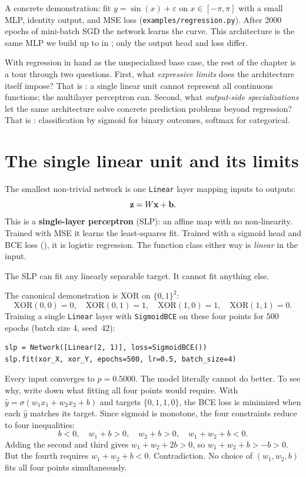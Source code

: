 A concrete demonstration: fit $y = \sin(x) + \varepsilon$ on
$x \in [-\pi, \pi]$ with a small MLP, identity output, and MSE loss
(\texttt{examples/regression.py}). After 2000 epochs of mini-batch SGD
the network learns the curve. This architecture is the same MLP we build
up to in ; only the output head and loss differ.

With regression in hand as the unspecialized base case, the rest of the
chapter is a tour through two questions. First, what
\emph{expressive limits} does the architecture itself impose? That is
: a single linear unit cannot
represent all continuous functions; the multilayer perceptron can.
Second, what \emph{output-side specializations} let the same
architecture solve concrete prediction problems beyond regression? That
is : classification by sigmoid for
binary outcomes, softmax for categorical.

\section{The single linear unit and its limits}\label{sec:linear-limits}

The smallest non-trivial network is one \texttt{Linear} layer mapping
inputs to outputs:
\[
  \mathbf{z} = W \mathbf{x} + \mathbf{b}.
\]
This is a \textbf{single-layer perceptron} (SLP): an affine map with no
non-linearity. Trained with MSE it learns the least-squares fit. Trained
with a sigmoid head and BCE loss (), it is logistic
regression. The function class either way is \emph{linear} in the input.

The SLP can fit any linearly separable target. It cannot fit anything
else.

The canonical demonstration is XOR on $\{0, 1\}^2$:
\[
  \mathrm{XOR}(0,0) = 0, \quad
  \mathrm{XOR}(0,1) = 1, \quad
  \mathrm{XOR}(1,0) = 1, \quad
  \mathrm{XOR}(1,1) = 0.
\]
Training a single \texttt{Linear} layer with \texttt{SigmoidBCE} on these
four points for 500 epochs (batch size 4, seed~42):
\begin{lstlisting}
slp = Network([Linear(2, 1)], loss=SigmoidBCE())
slp.fit(xor_X, xor_Y, epochs=500, lr=0.5, batch_size=4)
\end{lstlisting}
Every input converges to $p = 0.5000$. The model literally cannot do
better. To see why, write down what fitting all four points would
require. With $\hat{y} = \sigma(w_1 x_1 + w_2 x_2 + b)$ and targets
$\{0, 1, 1, 0\}$, the BCE loss is minimized when each $\hat{y}$ matches
its target. Since sigmoid is monotone, the four constraints reduce to
four inequalities:
\[
  b < 0, \quad
  w_1 + b > 0, \quad
  w_2 + b > 0, \quad
  w_1 + w_2 + b < 0.
\]
Adding the second and third gives $w_1 + w_2 + 2b > 0$, so
$w_1 + w_2 + b > -b > 0$. But the fourth requires
$w_1 + w_2 + b < 0$. Contradiction. No choice of $(w_1, w_2, b)$
fits all four points simultaneously.

